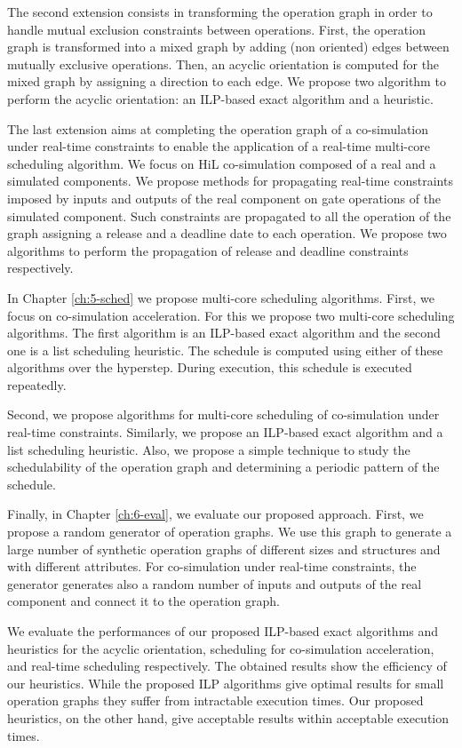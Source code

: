The second extension consists in transforming the operation graph in order to handle mutual exclusion constraints between operations. First, the operation graph is transformed into a mixed graph by adding (non oriented) edges between mutually exclusive operations. Then, an acyclic orientation is computed for the mixed graph by assigning a direction to each edge. We propose two algorithm to perform the acyclic orientation: an ILP-based exact algorithm and a heuristic.

The last extension aims at completing the operation graph of a co-simulation under real-time constraints to enable the application of a real-time multi-core scheduling algorithm. We focus on HiL co-simulation composed of a real and a simulated components. We propose methods for propagating real-time constraints imposed by inputs and outputs of the real component on gate operations of the simulated component. Such constraints are propagated to all the operation of the graph assigning a release and a deadline date to each operation. We propose two algorithms to perform the propagation of release and deadline constraints respectively.

In Chapter \ref{ch:5-sched} we propose multi-core scheduling algorithms. First, we focus on co-simulation acceleration. For this we propose two multi-core scheduling algorithms. The first algorithm is an ILP-based exact algorithm and the second one is a list scheduling heuristic. The schedule is computed using either of these algorithms over the hyperstep. During execution, this schedule is executed repeatedly.

Second, we propose algorithms for multi-core scheduling of co-simulation under real-time constraints. Similarly, we propose an ILP-based exact algorithm and a list scheduling heuristic. Also, we propose a simple technique to study the schedulability of the operation graph and determining a periodic pattern of the schedule.

Finally, in Chapter \ref{ch:6-eval}, we evaluate our proposed approach. First, we propose a random generator of operation graphs. We use this graph to generate a large number of synthetic operation graphs of different sizes and structures and with different attributes. For co-simulation under real-time constraints, the generator generates also a random number of inputs and outputs of the real component and connect it to the operation graph. 

We evaluate the performances of our proposed ILP-based exact algorithms and heuristics for the acyclic orientation, scheduling for co-simulation acceleration, and real-time scheduling respectively. The obtained results show the efficiency of our heuristics. While the proposed ILP algorithms give optimal results for small operation graphs they suffer from intractable execution times. Our proposed heuristics, on the other hand, give acceptable results within acceptable execution times.

